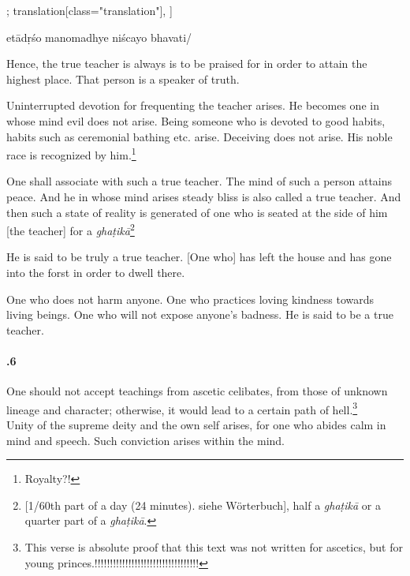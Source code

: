 \begin{alignment}[
  texts=edition[class="edition"];
  translation[class="translation"],
  ]
\begin{edition}
\begin{prose}
etādṛśo manomadhye niścayo bhavati/
\end{prose}
  \end{edition}
  \begin{translation}
    \begin{tlate}
Hence, the true teacher is always is to be praised for in order to attain the highest place. That person is a speaker of truth. 

Uninterrupted devotion for frequenting the teacher arises. He becomes one in whose mind evil does not arise. Being someone who is devoted to good habits, habits such as ceremonial bathing etc. arise. Deceiving does not arise. His noble race is recognized by him.\footnote{Royalty?!}

One shall associate with such a true teacher. The mind of such a person attains peace. And he in whose mind arises steady bliss is also called a true teacher. And then such a state of reality is generated of one who is seated at the side of him [the teacher] for a \textit{ghaṭikā}\footnote{[1/60th part of a day (24 minutes). siehe Wörterbuch], half a \textit{ghaṭikā} or a quarter part of a \textit{ghaṭikā}.}

He is said to be truly a true teacher. [One who] has left the house and has gone into the forst in order to dwell there.

One who does not harm anyone. One who practices loving kindness towards living beings. One who will not expose anyone's badness. He is said to be a true teacher.

\paragraph{.6} One should not accept teachings from ascetic celibates, from those of unknown lineage and character; otherwise, it would lead to a certain path of hell.\footnote{This verse is absolute proof that this text was not written for ascetics, but for young princes.!!!!!!!!!!!!!!!!!!!!!!!!!!!!!!!!!!}\\

\bigskip
Unity of the supreme deity and the own self arises, for one who abides calm in mind and speech. Such conviction arises within the mind. 
    \end{tlate}
  \end{translation}
\end{alignment}
